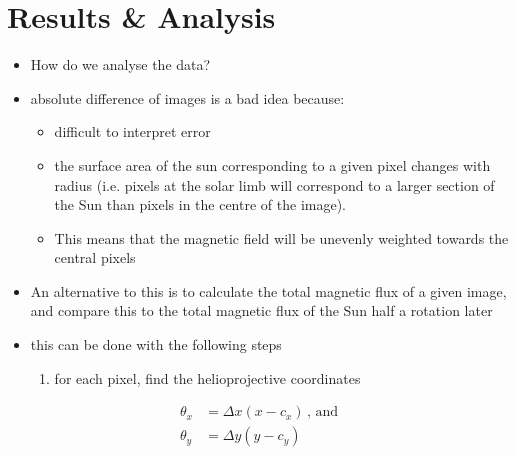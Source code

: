 \documentclass[11pt,a4paper,onecolumn]{report}
\begin{document}
\begin{figure}[t]
{  }%
  \caption[]{}
  \label{fig:6.11.11}
\end{figure}


%
%
%
%
%
%
%
%
\chapter{Results \& Analysis}
%
%
%
%
%
%


\begin{itemize}
  \item How do we analyse the data?
  \item absolute difference of images is a bad idea because:
  \begin{itemize}
    \item difficult to interpret error
    \item the surface area of the sun corresponding to a given pixel changes
    with radius (i.e. pixels at the solar limb will correspond to a larger
    section of the Sun than pixels in the centre of the image).
    \item This means that the magnetic field will be unevenly weighted towards
    the central pixels
  \end{itemize}
  \item An alternative to this is to calculate the total magnetic flux of a
  given image, and compare this to the total magnetic flux of the Sun half a
  rotation later
  \item this can be done with the following steps
  \begin{enumerate}
    \item for each pixel, find the helioprojective coordinates
  \end{enumerate}
\end{itemize}

\begin{align}
  \theta_x &= \Delta x (x - c_x) \, \text{, and} \\
  \theta_y &= \Delta y (y - c_y)
\end{align}
\end{document}
